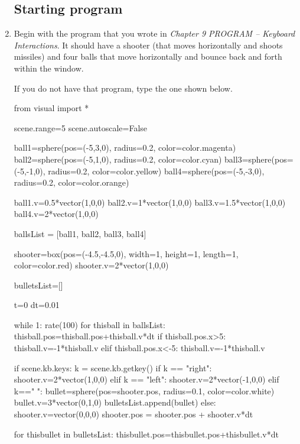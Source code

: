 \begin{enumerate}

\subsection*{Starting program}

	\item Begin with the program that you wrote in \emph{Chapter 9 PROGRAM -- Keyboard Interactions}. It should have a shooter (that moves horizontally and shoots missiles) and four balls that move horizontally and bounce back and forth within the window.
	
	If you do not have that program, type the one shown below.
	
\begin{myvpython}
from visual import *

scene.range=5
scene.autoscale=False

ball1=sphere(pos=(-5,3,0), radius=0.2, color=color.magenta)
ball2=sphere(pos=(-5,1,0), radius=0.2, color=color.cyan)
ball3=sphere(pos=(-5,-1,0), radius=0.2, color=color.yellow)
ball4=sphere(pos=(-5,-3,0), radius=0.2, color=color.orange)

ball1.v=0.5*vector(1,0,0)
ball2.v=1*vector(1,0,0)
ball3.v=1.5*vector(1,0,0)
ball4.v=2*vector(1,0,0)

ballsList = [ball1, ball2, ball3, ball4]

shooter=box(pos=(-4.5,-4.5,0), width=1, height=1, length=1, color=color.red)
shooter.v=2*vector(1,0,0)

bulletsList=[]

t=0
dt=0.01

while 1:
    rate(100)
    for thisball in ballsList:
        thisball.pos=thisball.pos+thisball.v*dt
        if thisball.pos.x>5:
            thisball.v=-1*thisball.v
        elif thisball.pos.x<-5:
            thisball.v=-1*thisball.v

    if scene.kb.keys:
            k = scene.kb.getkey()
            if k == "right":
                shooter.v=2*vector(1,0,0)
            elif k == "left":
                shooter.v=2*vector(-1,0,0)
            elif k==" ":
                bullet=sphere(pos=shooter.pos, radius=0.1, color=color.white)
                bullet.v=3*vector(0,1,0)
                bulletsList.append(bullet)
            else:
                shooter.v=vector(0,0,0)
    shooter.pos = shooter.pos + shooter.v*dt

    for thisbullet in bulletsList:
        thisbullet.pos=thisbullet.pos+thisbullet.v*dt
    

\end{myvpython}
\end{enumerate}
